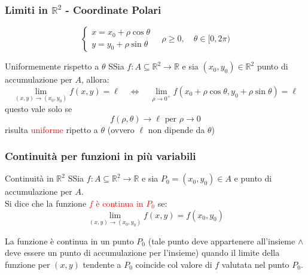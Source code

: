 \documentclass{article}  %
\begin{document}
\subsubsection{Limiti in $\mathbb{R}^2$ - Coordinate Polari}
\[
	\begin{cases}
		x = x_0 + \rho \cos \theta \\[0.5em]
		y = y_0 + \rho \sin \theta
	\end{cases}
	\quad \rho \geq 0, \quad \theta \in [0, 2\pi)
\]
\begin{definition}{Uniformemente rispetto a $\theta$}
	SSia $f: A \subseteq \mathbb{R}^2 \to \mathbb{R}$ e sia $(x_0, y_0) \in \mathbb{R}^2$ punto di accumulazione per $A$, allora:
	\[
		\lim_{(x,y) \to (x_0,y_0)}f(x,y) = \ell \quad \iff \quad \lim_{\rho \to 0^+}f(x_0 + \rho \cos \theta, y_0 + \rho \sin \theta) = \ell
	\]
	questo vale solo se
	\[
		f(\rho, \theta) \to \ell \text{ per } \rho \to 0
	\]
	risulta \textcolor{red}{uniforme} ripetto a $\theta$ (ovvero $\ell$ non dipende da $\theta$)
\end{definition}
\subsubsection{Continuità per funzioni in più variabili}
\begin{definition}{Continuità in $\mathbb{R}^2$}
	SSia $f: A \subseteq \mathbb{R}^2 \to \mathbb{R}$ e sia $P_0=(x_0,y_0) \in A$ e punto di accumulazione per $A$. \\
	Si dice che la funzione \textcolor{red}{$f$ è continua in $P_0$} se:
	\[
		\lim_{(x,y) \to (x_0,y_0)} f(x,y) = f(x_0,y_0)
	\]
\end{definition}
La funzione è continua in un punto $P_0$ (tale punto deve appartenere all'insieme $\land$ deve essere un punto di accumulazione per l'insieme) quando il limite della funzione per $(x,y)$ tendente a $P_0$ coincide col valore di $f$ valutata nel punto $P_0$.
\end{document}
